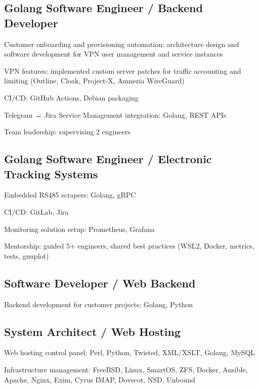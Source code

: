 \documentclass[letter,10pt]{article}
\begin{document}
\subsection{Golang Software Engineer / Backend Developer}
\begin{zitemize}
\item Customer onboarding and provisioning automation: architecture design and software development for VPN user management and service instances
\item VPN features: implemented custom server patches for traffic accounting and limiting (Outline, Cloak, Project-X, Amnezia WireGuard)
\item CI/CD: GitHub Actions, Debian packaging
\item Telegram ↔ Jira Service Management integration: Golang, REST APIs
\item Team leadership: supervising 2 engineers
\end{zitemize}

\subsection{Golang Software Engineer / Electronic Tracking Systems}
\begin{zitemize}
\item Embedded RS485 scrapers: Golang, gRPC
\item CI/CD: GitLab, Jira
\item Monitoring solution setup: Prometheus, Grafana
\item Mentorship: guided 5+ engineers, shared best practices (WSL2, Docker, metrics, tests, gnuplot)
\end{zitemize}

\subsection{Software Developer / Web Backend}
\begin{zitemize}
\item Backend development for customer projects: Golang, Python
\end{zitemize}

\subsection{System Architect / Web Hosting}
\begin{zitemize}
\item Web hosting control panel: Perl, Python, Twisted, XML/XSLT, Golang, MySQL
\item Infrastructure management: FreeBSD, Linux, SmartOS, ZFS, Docker, Ansible, Apache, Nginx, Exim, Cyrus IMAP, Dovecot, NSD, Unbound
\end{zitemize}
\end{document}
